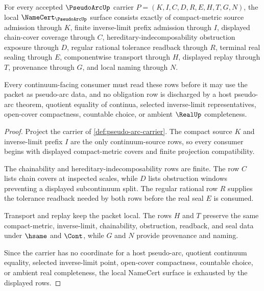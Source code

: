 \begin{theorem}
\label{thm:pseudo-arc-namecert-obligations}
For every accepted $\PseudoArcUp$ carrier $P=(K,I,C,D,R,E,H,T,G,N)$, the local $\NameCert_{\PseudoArcUp}$ surface consists exactly of compact-metric source admission through $K$, finite inverse-limit prefix admission through $I$, displayed chain-cover coverage through $C$, hereditary-indecomposability obstruction exposure through $D$, regular rational tolerance readback through $R$, terminal real sealing through $E$, componentwise transport through $H$, displayed replay through $T$, provenance through $G$, and local naming through $N$.

Every continuum-facing consumer must read these rows before it may use the packet as pseudo-arc data, and no obligation row is discharged by a host pseudo-arc theorem, quotient equality of continua, selected inverse-limit representatives, open-cover compactness, countable choice, or ambient $\RealUp$ completeness.
\end{theorem}
\begin{proof}
Project the carrier of \autoref{def:pseudo-arc-carrier}. The compact source $K$ and inverse-limit prefix $I$ are the only continuum-source rows, so every consumer begins with displayed compact-metric covers and finite projection compatibility.

The chainability and hereditary-indecomposability rows are finite. The row $C$ lists chain covers at inspected scales, while $D$ lists obstruction windows preventing a displayed subcontinuum split. The regular rational row $R$ supplies the tolerance readback needed by both rows before the real seal $E$ is consumed.

Transport and replay keep the packet local. The rows $H$ and $T$ preserve the same compact-metric, inverse-limit, chainability, obstruction, readback, and seal data under $\hsame$ and $\Cont$, while $G$ and $N$ provide provenance and naming.

Since the carrier has no coordinate for a host pseudo-arc, quotient continuum equality, selected inverse-limit point, open-cover compactness, countable choice, or ambient real completeness, the local NameCert surface is exhausted by the displayed rows.
\end{proof}


